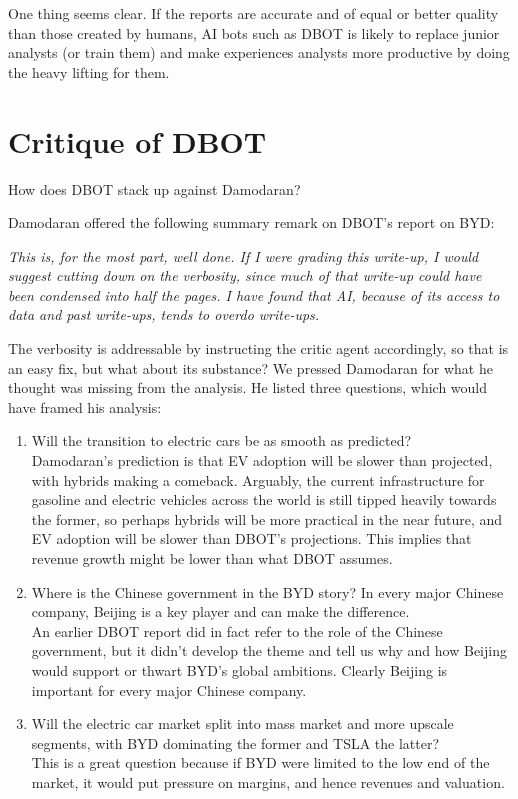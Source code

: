 \documentclass[]{interact}
\theoremstyle{plain}%
\theoremstyle{definition}
\theoremstyle{remark}
\begin{document}
One thing seems clear. If the reports are accurate and of equal or better quality than those created by humans, AI bots such as DBOT is likely to replace junior analysts (or train them) and make experiences analysts more productive by doing the heavy lifting for them.

\section{Critique of DBOT}
\noindent
How does DBOT stack up against Damodaran?

\noindent
Damodaran offered the following summary remark on DBOT’s report on BYD:

\noindent
\textit{This is, for the most part, well done. If I were grading this write-up, I would suggest cutting down on the verbosity, since much of that write-up could have been condensed into half the pages. I have found that AI, because of its access to data and past write-ups, tends to overdo write-ups.}

The verbosity is addressable by instructing the critic agent accordingly, so that is an easy fix, but what about its substance? We pressed Damodaran for what he thought was missing from the analysis. He listed three questions, which would have framed his analysis:

\begin{enumerate}
    \item Will the transition to electric cars be as smooth as predicted?\\

\noindent
Damodaran’s prediction is that EV adoption will be slower than projected, with hybrids making a comeback. Arguably, the current infrastructure for gasoline and electric vehicles across the world is still tipped heavily towards the former, so perhaps hybrids will be more practical in the near future, and EV adoption will be slower than DBOT’s projections. This implies that revenue growth might be lower than what DBOT assumes. \\

    \item Where is the Chinese government in the BYD story? In every major Chinese company, Beijing is a key player and can make the difference.\\

\noindent
An earlier DBOT report did in fact refer to the role of the Chinese government, but it didn’t develop the theme and tell us why and how Beijing would support or thwart BYD’s global ambitions. Clearly Beijing is important for every major Chinese company.\\

\item Will the electric car market split into mass market and more upscale segments, with BYD dominating the former and TSLA the latter?\\

\noindent
This is a great question because if BYD were limited to the low end of the market, it would put pressure on margins, and hence revenues and valuation. 
\end{enumerate}
\end{document}
